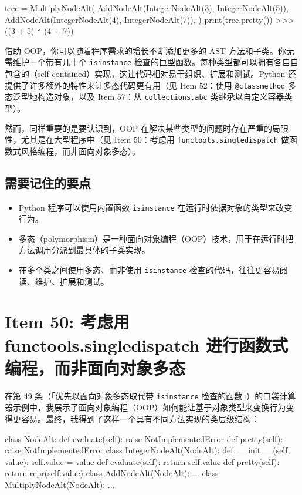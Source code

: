 \begin{codebox}[python]
tree = MultiplyNodeAlt(
    AddNodeAlt(IntegerNodeAlt(3), IntegerNodeAlt(5)),
    AddNodeAlt(IntegerNodeAlt(4), IntegerNodeAlt(7)),
)
print(tree.pretty())
>>>
((3 + 5) * (4 + 7))
\end{codebox}

借助 OOP，你可以随着程序需求的增长不断添加更多的 AST 方法和子类。你无需维护一个带有几十个 \texttt{isinstance} 检查的巨型函数。每种类型都可以拥有各自自包含的（self-contained）实现，这让代码相对易于组织、扩展和测试。Python 还提供了许多额外的特性来让多态代码更有用（见 Item 52：使用 \texttt{@classmethod} 多态泛型地构造对象，以及 Item 57：从 \texttt{collections.abc} 类继承以自定义容器类型）。

然而，同样重要的是要认识到，OOP 在解决某些类型的问题时存在严重的局限性，尤其是在大型程序中（见 Item 50：考虑用 \texttt{functools.singledispatch} 做函数式风格编程，而非面向对象多态）。

\subsection{需要记住的要点}

\begin{itemize}
\item Python 程序可以使用内置函数 \texttt{isinstance} 在运行时依据对象的类型来改变行为。
\item 多态（polymorphism）是一种面向对象编程（OOP）技术，用于在运行时把方法调用分派到最具体的子类实现。
\item 在多个类之间使用多态、而非使用 \texttt{isinstance} 检查的代码，往往更容易阅读、维护、扩展和测试。
\end{itemize}

\section{Item 50: 考虑用 functools.singledispatch 进行函数式编程，而非面向对象多态}

在第 49 条（「优先以面向对象多态取代带 \texttt{isinstance} 检查的函数」）的口袋计算器示例中，我展示了面向对象编程（OOP）如何能让基于对象类型来变换行为变得更容易。最终，我得到了这样一个具有不同方法实现的类层级结构：

\begin{codebox}[python]
class NodeAlt:
    def evaluate(self):
        raise NotImplementedError
    def pretty(self):
        raise NotImplementedError
class IntegerNodeAlt(NodeAlt):
    def __init__(self, value):
        self.value = value
    def evaluate(self):
        return self.value
    def pretty(self):
        return repr(self.value)
class AddNodeAlt(NodeAlt):
    ...
class MultiplyNodeAlt(NodeAlt):
    ...
\end{codebox}

